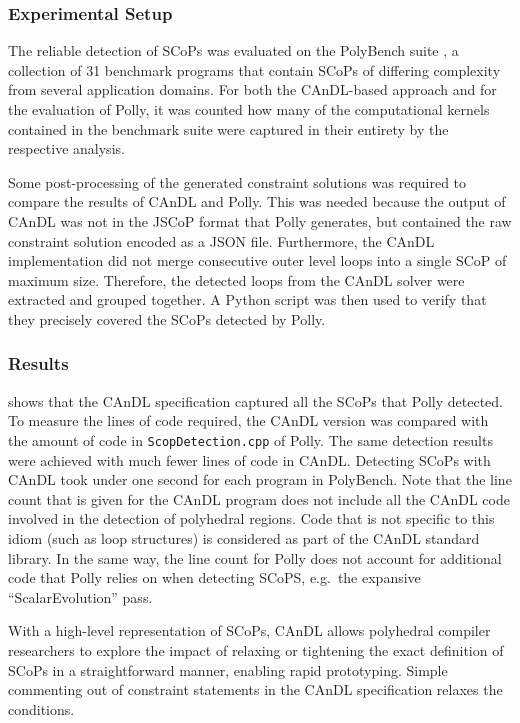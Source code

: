 \subsubsection{Experimental Setup}

    The reliable detection of SCoPs was evaluated on the PolyBench suite
    \citep{polybench}, a collection of 31 benchmark programs that contain SCoPs
    of differing complexity from several application domains.
    For both the CAnDL-based approach and for the evaluation of Polly, it was
    counted how many of the computational kernels contained in the benchmark
    suite were captured in their entirety by the respective analysis.

    Some post-processing of the generated constraint solutions was required to
    compare the results of CAnDL and Polly.
    This was needed because the output of CAnDL was not in the JSCoP format
    that Polly generates, but contained the raw constraint solution
    encoded as a JSON file.
    Furthermore, the CAnDL implementation did not merge consecutive outer level
    loops into a single SCoP of maximum size.
    Therefore, the detected loops from the CAnDL solver were extracted and
    grouped together.
    A Python script was then used to verify that they precisely covered the
    SCoPs detected by Polly.

\subsubsection{Results}

     shows that the CAnDL specification captured all the
    SCoPs that Polly detected.
    To measure the lines of code required, the CAnDL version was compared with
    the amount of code in \texttt{ScopDetection.cpp} of Polly.
    The same detection results were achieved with much fewer lines of code in
    CAnDL.
    Detecting SCoPs with CAnDL took under one second for each program in
    PolyBench.
    Note that the line count that is given for the CAnDL program does not
    include all the CAnDL code involved in the detection of polyhedral regions.
    Code that is not specific to this idiom (such as loop structures) is
    considered as part of the CAnDL standard library.
    In the same way, the line count for Polly does not account for additional
    code that Polly relies on when detecting SCoPS, e.g.\ the expansive
    ``ScalarEvolution'' pass.

    With a high-level representation of SCoPs, CAnDL allows polyhedral
    compiler researchers to explore the impact of relaxing or tightening the
    exact definition of SCoPs in a straightforward manner, enabling rapid
    prototyping.
    Simple commenting out of constraint statements in the CAnDL specification
    relaxes the conditions.

